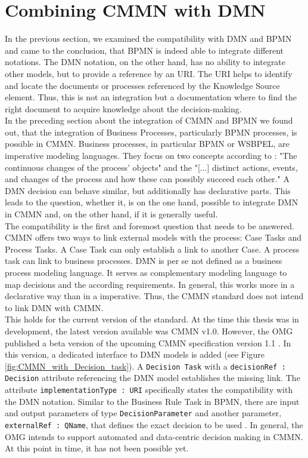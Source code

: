 \section{Combining CMMN with DMN}
In the previous section, we examined the compatibility with DMN and BPMN and came to the conclusion, that BPMN is indeed able to integrate different notations. The DMN notation, on the other hand, has no ability to integrate other models, but to provide a reference by an \ac{URI}. The URI helps to identify and locate the documents or processes referenced by the Knowledge Source element. Thus, this is not an integration but a documentation where to find the right document to acquire knowledge about the decision-making. \\
In the preceding section about the integration of CMMN and BPMN we found out, that the integration of Business Processes, particularly BPMN processes, is possible in CMMN. Business processes, in particular \ac{BPMN} or \ac{WSBPEL}, are imperative modeling languages. They focus on two concepts according to \cite{FahlandLuebkeMendlingEtAl2009}: "The continuous changes of the process' objects" and the "[...] distinct actions, events, and changes of the process and how these can possibly succeed each other." A DMN decision can behave similar, but additionally has declarative parts. This leads to the question, whether it, is on the one hand, possible to integrate DMN in CMMN and, on the other hand, if it is generally useful. \\

The compatibility is the first and foremost question that needs to be answered. CMMN offers two ways to link external models with the process: Case Tasks and Process Tasks. A Case Task can only establish a link to another Case. A process task can link to business processes. DMN is per se not defined as a business process modeling language. It serves as complementary modeling language to map decisions and the according requirements. In general, this works more in a declarative way than in a imperative. Thus, the CMMN standard does not intend to link DMN with CMMN. \\ %
This holds for the current version of the standard. At the time this thesis was in development, the latest version available was CMMN v1.0. However, the OMG published a beta version of the upcoming CMMN specification version 1.1 \cite{CMMNbeta}. In this version, a dedicated interface to DMN models is added (see Figure \ref{fig:CMMN_with_Decision_task}). A \texttt{Decision Task} with a \texttt{decisionRef : Decision} attribute referencing the DMN model establishes the missing link. The attribute \texttt{implementationType : URI} specifically states the compatibility with the DMN notation. Similar to the Business Rule Task in BPMN, there are input and output parameters of type \texttt{DecisionParameter} and another parameter, \texttt{externalRef : QName}, that defines the exact decision to be used \cite{CMMNbeta}. 
In general, the OMG intends to support automated and data-centric decision making in CMMN. At this point in time, it has not been possible yet.  \\

